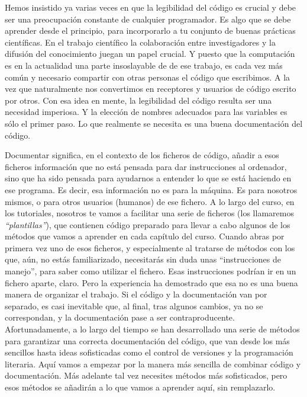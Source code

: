 \documentclass[10pt,a4paper]{article}\usepackage[]{graphicx}\usepackage[]{color}
\newcounter {cont01}
\begin{document}
Hemos insistido ya varias veces en que la legibilidad del código es crucial y debe ser una preocupación constante de cualquier programador. Es algo que se debe aprender desde el principio, para incorporarlo a tu conjunto de buenas prácticas científicas.  En el trabajo científico la colaboración entre investigadores y la difusión del conocimiento juegan un papel crucial. Y puesto que la computación es en la actualidad una parte insoslayable de de ese trabajo, es cada vez más común y necesario compartir con otras personas el código que escribimos. A la vez que naturalmente nos convertimos en receptores y usuarios de código escrito por otros.  Con esa idea en mente, la legibilidad del código resulta ser una necesidad imperiosa. Y la elección de nombres adecuados para las variables es sólo el primer paso. Lo que realmente se necesita es una buena {\sf documentación} del código.

Documentar significa, en el contexto de los ficheros de código, añadir a esos ficheros información que no está pensada para dar instrucciones al ordenador, sino que ha sido  pensada para ayudarnos a entender lo que se está haciendo en ese programa. Es decir, esa información no es para la máquina. Es para nosotros mismos, o para otros usuarios (humanos) de ese fichero. A lo largo del curso, en los tutoriales, nosotros te vamos a facilitar una serie de ficheros (los llamaremos {\em ``plantillas''}), que contienen código preparado para llevar a cabo algunos de los métodos que vamos a aprender en cada capítulo del curso. Cuando abras por primera vez uno de esos ficheros, y especialmente al tratarse de métodos con los que, aún, no estás familiarizado, necesitarás sin duda unas ``instrucciones de manejo'', para saber como utilizar el fichero. Esas instrucciones podrían ir en un fichero aparte, claro. Pero la experiencia ha demostrado que esa no es una buena manera de organizar el trabajo. Si el código y la documentación van por separado, es casi inevitable que, al final, tras algunos cambios, ya no se correspondan, y la documentación pase a ser contraproducente.  Afortunadamente, a lo largo del tiempo se han desarrollado una serie de métodos para garantizar una correcta documentación del código, que van desde los más sencillos hasta ideas sofisticadas como el control de versiones y la programación literaria. Aquí vamos a empezar por la manera más sencilla de combinar código y documentación. Más adelante tal vez necesites métodos más sofisticados, pero esos métodos se añadirán a lo que vamos a aprender aquí, sin remplazarlo.
\end{document}
